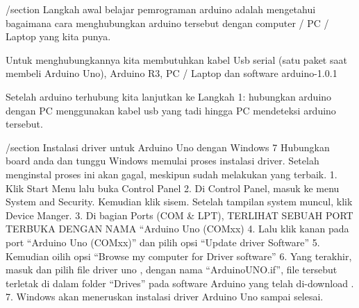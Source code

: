  /section
 Langkah awal belajar pemrograman arduino adalah mengetahui bagaimana cara menghubungkan arduino tersebut dengan computer / PC / Laptop yang kita punya.

Untuk menghubungkannya kita membutuhkan kabel Usb serial (satu paket saat membeli Arduino Uno), Arduino R3, PC / Laptop dan software arduino-1.0.1

Setelah arduino terhubung kita lanjutkan ke Langkah 1:
hubungkan arduino dengan PC menggunakan kabel usb yang tadi hingga PC mendeteksi arduino tersebut.

/section
Instalasi driver untuk Arduino Uno dengan Windows 7
Hubungkan board anda dan tunggu Windows memulai proses instalasi driver. Setelah menginstal proses ini akan gagal, meskipun sudah melakukan yang terbaik.
1.	Klik Start Menu lalu buka Control Panel
2.	Di Control Panel, masuk ke menu System and Security. Kemudian klik sisem. Setelah tampilan system muncul, klik Device Manger.
3.	Di bagian Ports (COM & LPT), TERLIHAT SEBUAH PORT TERBUKA DENGAN NAMA “Arduino Uno (COMxx)
4.	Lalu klik kanan pada port “Arduino Uno (COMxx)” dan pilih opsi “Update driver Software”
5.	Kemudian oilih opsi “Browse my computer for Driver software”
6.	Yang terakhir, masuk dan pilih file driver uno , dengan nama “ArduinoUNO.if”, file tersebut terletak di dalam folder “Drives” pada software Arduino yang telah di-download .
7.	Windows akan meneruskan instalasi driver Arduino Uno sampai selesai.
